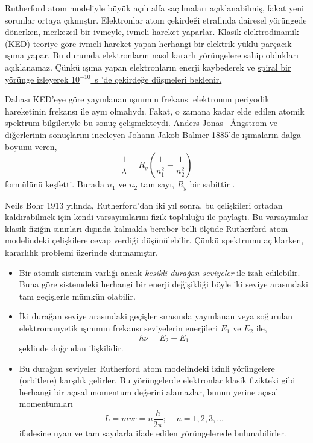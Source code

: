 \documentclass[00_kitap.tex]{subfiles}
\begin{document}
Rutherford atom modeliyle büyük açılı alfa saçılmaları açıklanabilmiş, fakat yeni sorunlar ortaya çıkmıştır. Elektronlar atom çekirdeği etrafında dairesel yörüngede dönerken, merkezcil bir ivmeyle, ivmeli hareket yaparlar. Klasik elektrodinamik (KED) teoriye göre ivmeli hareket yapan herhangi bir elektrik yüklü parçacık ışıma yapar. Bu durumda elektronların nasıl kararlı yörüngelere sahip oldukları açıklanamaz. Çünkü ışıma yapan elektronların enerji kaybederek ve \href{http://bcs.wiley.com/he-bcs/Books?action=mininav&bcsId=1533&itemId=0471057002&assetId=17327&resourceId=1342}{spiral bir yörünge izleyerek 10$^{-10}$~s 'de çekirdeğe düşmeleri beklenir.} 

Dahası KED'eye göre yayınlanan ışınımın frekansı elektronun periyodik hareketinin frekansı ile aynı olmalıydı. Fakat, o zamana kadar elde edilen atomik spektrum bilgileriyle bu sonuç çelişmekteydi. Anders Jonas \SI{}{\angstrom}ngstrom ve diğerlerinin sonuçlarını inceleyen Johann Jakob Balmer 1885'de ışımaların dalga boyunu veren, 
\begin{equation}
\frac{1}{\lambda}= R_y \left( \frac{1}{n_1^2} - \frac{1}{n_2^2} \right)
\label{eq:balmer}
\end{equation}
formülünü keşfetti. Burada $n_1$ ve $n_2$ tam sayı, $R_y$ bir sabittir \cite{book:Gasiorowicz}.

Neils Bohr 1913 yılında, Rutherford'dan iki yıl sonra, bu çelişkileri ortadan kaldırabilmek için kendi varsayımlarını fizik topluluğu ile paylaştı. Bu varsayımlar klasik fiziğin sınırları dışında kalmakla beraber belli ölçüde Rutherford atom modelindeki çelişkilere cevap verdiği düşünülebilir. Çünkü spektrumu açıklarken, kararlılık problemi üzerinde durmamıştır.

\begin{itemize}
\item Bir atomik sistemin varlığı ancak {\it kesikli durağan seviyeler} ile izah edilebilir. Buna göre sistemdeki herhangi bir enerji değişikliği böyle iki seviye arasındaki tam geçişlerle mümkün olabilir.

\item İki durağan seviye arasındaki geçişler sırasında yayınlanan veya soğurulan elektromanyetik ışınımın frekansı seviyelerin enerjileri $E_1$ ve $E_2$ ile,
\begin{equation}
h\nu = E_2 - E_1
\label{eq:bohr_states}
\end{equation}
şeklinde doğrudan ilişkilidir.

\item Bu durağan seviyeler Rutherford atom modelindeki izinli yörüngelere (orbitlere) karşılık gelirler. Bu yörüngelerde elektronlar klasik fizikteki gibi herhangi bir açısal momentum değerini alamazlar, bunun yerine açısal momentumları
\begin{equation}
L = m v r  = n \frac{h}{2 \pi}
\label{eq:bohr_allowed_states}; \;\;\;\; n=1,2,3, \dots
\end{equation}
ifadesine uyan ve tam sayılarla ifade edilen yörüngelerede bulunabilirler.
\end{itemize}
\end{document}
